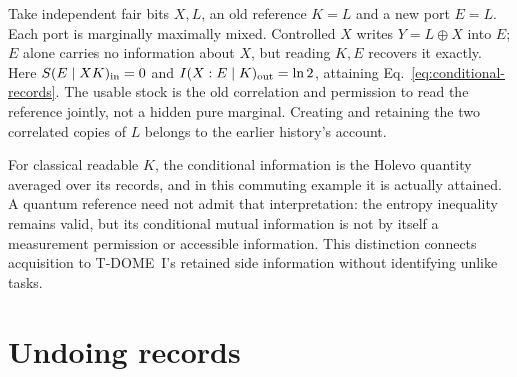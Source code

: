 \documentclass[12pt,a4paper]{article}
\begin{document}
Take independent fair bits \(X,L\), an old reference \(K=L\) and a
new port \(E=L\). Each port is marginally maximally mixed. Controlled
\(X\) writes \(Y=L\oplus X\) into \(E\); \(E\) alone carries no
information about \(X\), but reading \(K,E\) recovers it exactly.
Here \(S(E\mid XK)_{\rm in}=0\) and
\(I(X:E\mid K)_{\rm out}=\ln2\), attaining
Eq.~\eqref{eq:conditional-records}. The usable stock is the old
correlation and permission to read the reference jointly, not a hidden
pure marginal. Creating and retaining the two correlated copies of \(L\)
belongs to the earlier history's account.

For classical readable \(K\), the conditional information is the
Holevo quantity averaged over its records, and in this commuting example
it is actually attained. A quantum reference need not admit that
interpretation: the entropy inequality remains valid, but its conditional
mutual information is not by itself a measurement permission or accessible
information. This distinction connects acquisition to T-DOME~I's retained
side information without identifying unlike tasks.

\section{Undoing records}
\label{sec:erasure}
\end{document}
